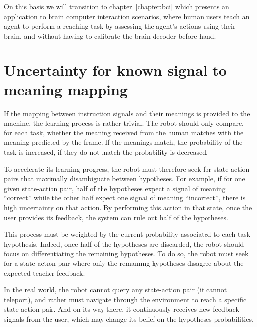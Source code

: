 On this basis we will transition to chapter~\ref{chapter:bci} which presents an application to brain computer interaction scenarios, where human users teach an agent to perform a reaching task by assessing the agent's actions using their brain, and without having to calibrate the brain decoder before hand.

\section{Uncertainty for known signal to meaning mapping}


If the mapping between instruction signals and their meanings is provided to the machine, the learning process is rather trivial. The robot should only compare, for each task, whether the meaning received from the human matches with the meaning predicted by the frame. If the meanings match, the probability of the task is increased, if they do not match the probability is decreased.

To accelerate its learning progress, the robot must therefore seek for state-action pairs that maximally disambiguate between hypotheses. For example, if for one given state-action pair, half of the hypotheses expect a signal of meaning ``correct'' while the other half expect one signal of meaning ``incorrect'', there is high uncertainty on that action. By performing this action in that state, once the user provides its feedback, the system can rule out half of the hypotheses.

This process must be weighted by the current probability associated to each task hypothesis. Indeed, once half of the hypotheses are discarded, the robot should focus on differentiating the remaining hypotheses. To do so, the robot must seek for a state-action pair where only the remaining hypotheses disagree about the expected teacher feedback.

In the real world, the robot cannot query any state-action pair (it cannot teleport), and rather must navigate through the environment to reach a specific state-action pair. And on its way there, it continuously receives new feedback signals from the user, which may change its belief on the hypotheses probabilities.

